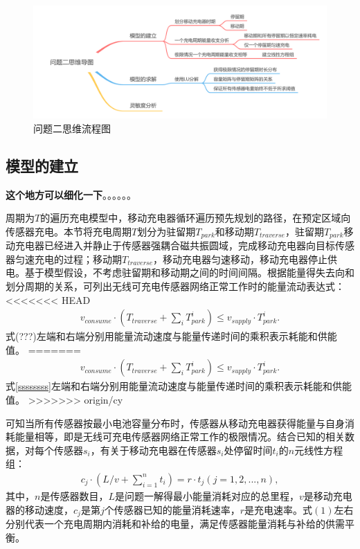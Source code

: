 \documentclass{whutmod}
\begin{document}
			\begin{figure}[H]
				\centering
				\includegraphics[width=\textwidth]{figures/222222.png}
				\caption{问题二思维流程图}\label{ssssct}

			\end{figure}
		
		\subsection{模型的建立}
			\textbf{这个地方可以细化一下}。。。。。。
			
			周期为$T$的遍历充电模型中，移动充电器循环遍历预先规划的路径，在预定区域向传感器充电。本节将充电周期$T$划分为驻留期$T_{park}$和移动期$T_{traverse}$，驻留期$T_{park}$移动充电器已经进入并静止于传感器强耦合磁共振圆域，完成移动充电器向目标传感器匀速充电的过程；移动期$T_{traverse}$，移动充电器匀速移动，移动充电器停止供电。基于模型假设，不考虑驻留期和移动期之间的时间间隔。根据能量得失去向和划分周期的关系，可列出无线可充电传感器网络正常工作时的能量流动表达式：
<<<<<<< HEAD
			\begin{gather}
			v_{consume}\cdot (T_{traverse}+\sum_{i} T_{park}^i)\leq v_{supply}\cdot T_{park}^i.
			\end{gather}
			式(???)左端和右端分别用能量流动速度与能量传递时间的乘积表示耗能和供能值。
=======
			\begin{gather}\label{ssssssss}
			v_{consume}\cdot (T_{traverse}+\sum_{i} T_{park}^i)\leq v_{supply}\cdot T_{park}^i.
			\end{gather}
			式\ref{ssssssss}左端和右端分别用能量流动速度与能量传递时间的乘积表示耗能和供能值。
>>>>>>> origin/cy
			
			可知当所有传感器按最小电池容量分布时，传感器从移动充电器获得能量与自身消耗能量相等，即是无线可充电传感器网络正常工作的极限情况。结合已知的相关数据，对每个传感器$s_i$，有关于移动充电器在传感器$s_i$处停留时间$t_i$的$n$元线性方程组：
			\begin{gather}
			c_{j} \cdot (L/v+\sum_{i=1}^{n}t_i)=r \cdot t_j (j=1,2,...,n),
			\end{gather}
			其中，$n$是传感器数目，$L$是问题一解得最小能量消耗对应的总里程，$v$是移动充电器的移动速度，$c_{j}$是第$j$个传感器已知的能量消耗速率，$r$是充电速率。式$(1)$左右分别代表一个充电周期内消耗和补给的电量，满足传感器能量消耗与补给的供需平衡。
			
\end{document}
